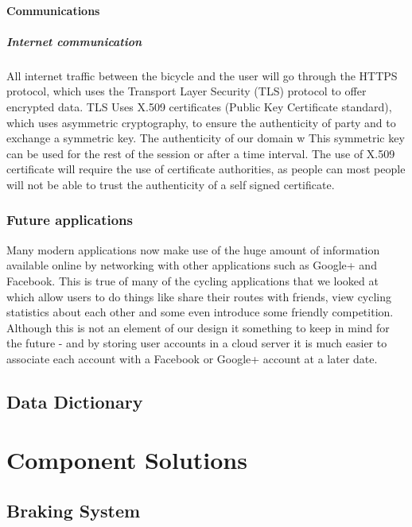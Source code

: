 \documentclass[a4paper]{report}
\begin{document}
\subsubsection{Communications}


\paragraph{Internet communication}

All internet traffic between the bicycle and the user will go through the HTTPS protocol, which uses the Transport Layer Security (TLS) protocol to offer encrypted data. TLS Uses X.509 certificates (Public Key Certificate standard), which uses asymmetric cryptography, to ensure the authenticity of party and to exchange a symmetric key. The authenticity of our domain w This symmetric key can be used for the rest of the session or after a time interval. The use of X.509 certificate will require the use of  certificate authorities, as people can most people will not be able to trust the authenticity of a self signed certificate.

\subsection{Future applications}
Many modern applications now make use of the huge amount of information available online by networking with other applications such as Google+ and Facebook. This is true of many of the cycling applications that we looked at which allow users to do things like share their routes with friends, view cycling statistics about each other and some even introduce some friendly competition. Although this is not an element of our design it something to keep in mind for the future - and by storing user accounts in a cloud server it is much easier to associate each account with a Facebook or Google+ account at a later date.
\section{Data Dictionary}

\chapter{Component Solutions}
\label{sec:component_solutions}
\section{Braking System}
\label{sec:comp_design_brakes}
\end{document}
